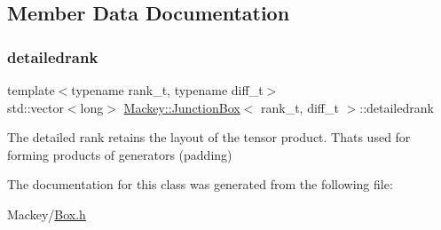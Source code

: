 \subsection{Member Data Documentation}
\mbox{\label{classMackey_1_1JunctionBox_a433ab2c79159bd2bce8d0fca0ab96be2}} 
\subsubsection{\texorpdfstring{detailedrank}{detailedrank}}
{\footnotesize\ttfamily template$<$typename rank\+\_\+t, typename diff\+\_\+t$>$ \\
std\+::vector$<$long$>$ \hyperlink{classMackey_1_1JunctionBox}{Mackey\+::\+Junction\+Box}$<$ rank\+\_\+t, diff\+\_\+t $>$\+::detailedrank}



The detailed rank retains the layout of the tensor product. That\textquotesingle{}s used for forming products of generators (padding) 



The documentation for this class was generated from the following file\+:\begin{DoxyCompactItemize}
\item 
Mackey/\hyperlink{Box_8h}{Box.\+h}\end{DoxyCompactItemize}
